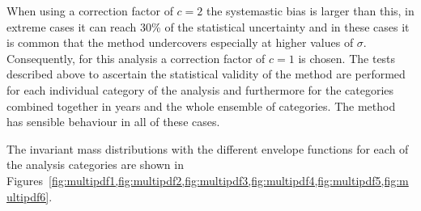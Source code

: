 When using a correction factor of $c=2$ the systemastic bias is larger than this, in extreme cases it can reach 30\% of the statistical uncertainty and in these cases it is common that the method undercovers especially at higher values of $\sigma$. Consequently, for this analysis a correction factor of $c=1$ is chosen. The tests described above to ascertain the statistical validity of the method are performed for each individual category of the analysis and furthermore for the categories combined together in years and the whole ensemble of categories. The method has sensible behaviour in all of these cases.

The invariant mass distributions with the different envelope functions for each of the analysis categories are shown in Figures~\cref{fig:multipdf1,fig:multipdf2,fig:multipdf3,fig:multipdf4,fig:multipdf5,fig:multipdf6}.


